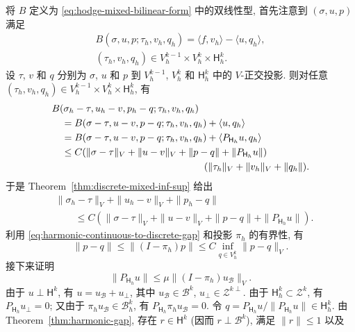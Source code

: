 \begin{Proof}
{将 $B$ 定义为 \eqref{eq:hodge-mixed-bilinear-form} 中的双线性型, 首先注意到 $(\sigma,u,p)$ 满足}
\[
\begin{gathered}
B(\sigma,u,p;\tau_h,v_h,q_h)=\langle f,v_h\rangle-\langle u,q_h\rangle,\\
(\tau_h,v_h,q_h)\in V_h^{k-1}\times V_h^k\times\mathsf H_h^k.
\end{gathered}
\]
{设 $\tau$, $v$ 和 $q$ 分别为 $\sigma$, $u$ 和 $p$ 到 $V_h^{k-1}$, $V_h^k$ 和 $\mathsf H_h^k$ 中的 $V$-正交投影. 则对任意 $(\tau_h,v_h,q_h)\in V_h^{k-1}\times V_h^k\times\mathsf H_h^k$, 有}
\[
\begin{aligned}
&B(\sigma_h-\tau,u_h-v,p_h-q;\tau_h,v_h,q_h)\\
&\quad=B(\sigma-\tau,u-v,p-q;\tau_h,v_h,q_h)+\langle u,q_h\rangle\\
&\quad=B(\sigma-\tau,u-v,p-q;\tau_h,v_h,q_h)+\langle P_{\mathsf H_h}u,q_h\rangle\\
&\quad\leq C(\|\sigma-\tau\|_V+\|u-v\|_V+\|p-q\|+\|P_{\mathsf H_h}u\|)\\
&\hspace{55mm}(\|\tau_h\|_V+\|v_h\|_V+\|q_h\|).
\end{aligned}
\]
{于是 Theorem~\ref{thm:discrete-mixed-inf-sup} 给出}
\begin{equation}\label{eq:mixed-error-discrete-stability}
\begin{aligned}
&\|\sigma_h-\tau\|_V+\|u_h-v\|_V+\|p_h-q\|\\
&\qquad\leq C(\|\sigma-\tau\|_V+\|u-v\|_V+\|p-q\|+\|P_{\mathsf H_h}u\|).
\end{aligned}
\end{equation}
{利用 \eqref{eq:harmonic-continuous-to-discrete-gap} 和投影 $\pi_h$ 的有界性, 有}
\begin{equation}\label{eq:mixed-error-harmonic-best-approximation}
\|p-q\|\leq\|(I-\pi_h)p\|\leq C\inf_{q\in V_h^k}\|p-q\|_V.
\end{equation}
{接下来证明}
\[
\|P_{\mathsf H_h}u\|\leq\mu\|(I-\pi_h)u_{\mathcal B}\|_V.
\]
{由于 $u\perp\mathsf H^k$, 有 $u=u_{\mathcal B}+u_\perp$, 其中 $u_{\mathcal B}\in\mathcal B^k$, $u_\perp\in\mathcal Z^{k\perp}$. 由于 $\mathsf H_h^k\subset\mathcal Z^k$, 有 $P_{\mathsf H_h}u_\perp=0$; 又由于 $\pi_hu_{\mathcal B}\in\mathcal B_h^k$, 有 $P_{\mathsf H_h}\pi_hu_{\mathcal B}=0$. 令 $q=P_{\mathsf H_h}u/\|P_{\mathsf H_h}u\|\in\mathsf H_h^k$. 由 Theorem~\ref{thm:harmonic-gap}, 存在 $r\in\mathsf H^k$ (因而 $r\perp\mathcal B^k$), 满足 $\|r\|\leq1$ 以及}

\end{Proof}
